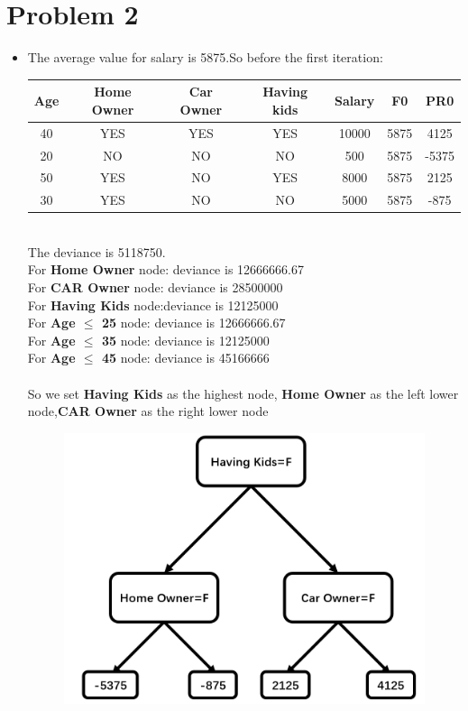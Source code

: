\documentclass[a4paper]{article}
\begin{document}
\section{Problem 2}
\begin{itemize}
    \item The average value for salary is 5875.So before the first iteration:
    \begin{table}[htbp]
        \begin{tabular}{|c|c|c|c|c|c|c|}
        \hline
        Age & Home Owner & Car Owner & Having kids & Salary & F0 & PR0 \\ \hline
        40 & YES & YES & YES & 10000 & 5875 & 4125 \\ \hline
        20 & NO & NO & NO & 500 & 5875 & -5375 \\ \hline
        50 & YES & NO & YES & 8000 & 5875 & 2125 \\ \hline
        30 & YES & NO & NO & 5000 & 5875 & -875 \\ \hline
        \end{tabular}
        \end{table}
    \\The deviance is 5118750.
    \\For \textbf{Home Owner} node: deviance is 12666666.67
    \\For \textbf{CAR Owner} node: deviance is 28500000
    \\For \textbf{Having Kids} node:deviance is 12125000
    \\For \textbf{Age $\leq$ 25} node: deviance is 12666666.67
    \\For \textbf{Age $\leq$ 35} node: deviance is 12125000
    \\For \textbf{Age $\leq$ 45} node: deviance is 45166666
    \\\\So we set \textbf{Having Kids} as the highest node, \textbf{Home Owner} as the left lower node,\textbf{CAR Owner} as the right lower node
    \begin{figure}[H]
        \centering
        \includegraphics[scale=0.25]{P1.png}

\end{figure}
\end{itemize}
\end{document}

